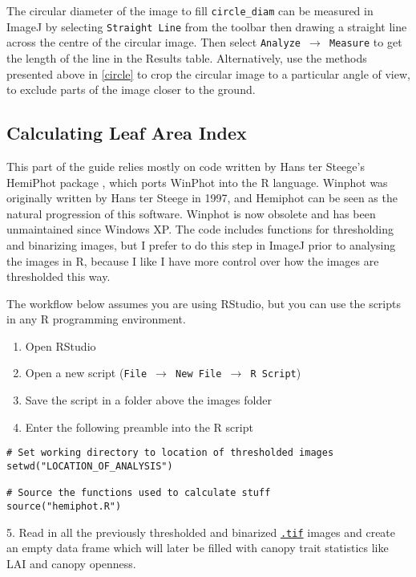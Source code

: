 \documentclass{article}
\newcommand\menu[1]{\texttt{\color{blue}#1}}
\newcommand\file[1]{\texttt{\underline{#1}}}
\begin{document}
The circular diameter of the image to fill \verb|circle_diam| can be measured in ImageJ by selecting \menu{Straight Line} from the toolbar then drawing a straight line across the centre of the circular image. Then select \menu{Analyze $\rightarrow$ Measure} to get the length of the line in the Results table. Alternatively, use the methods presented above in \autoref{circle} to crop the circular image to a particular angle of view, to exclude parts of the image closer to the ground.

\subsection{Calculating Leaf Area Index}

This part of the guide relies mostly on code written by Hans ter Steege's HemiPhot package \citep{Steege2018}, which ports WinPhot into the R language. Winphot was originally written by Hans ter Steege in 1997, and Hemiphot can be seen as the natural progression of this software. Winphot is now obsolete and has been unmaintained since Windows XP. The code includes functions for thresholding and binarizing images, but I prefer to do this step in ImageJ prior to analysing the images in R, because I like I have more control over how the images are thresholded this way.

The workflow below assumes you are using RStudio, but you can use the scripts in any R programming environment. 

\begin{enumerate}
	\item{Open RStudio}
	\item{Open a new script (\menu{File $\rightarrow$ New File $\rightarrow$ R Script})}
	\item{Save the script in a folder above the images folder}
	\item{Enter the following preamble into the R script}
\end{enumerate}

\begin{minipage}{\linewidth}
\begin{lstlisting}
# Set working directory to location of thresholded images
setwd("LOCATION_OF_ANALYSIS")

# Source the functions used to calculate stuff
source("hemiphot.R")
\end{lstlisting}
\end{minipage}

5. Read in all the previously thresholded and binarized \file{.tif} images and create an empty data frame which will later be filled with canopy trait statistics like LAI and canopy openness.
\end{document}

